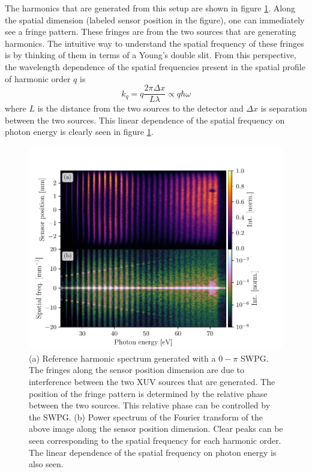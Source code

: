 The harmonics that are generated from this setup are shown in figure \ref{fig:ref_img_pow_spec}. Along the spatial dimension (labeled sensor position in the figure), one can immediately see a fringe pattern.  These fringes are from the two sources that are generating harmonics.  The intuitive way to understand the spatial frequency of these fringes is by thinking of them in terms of a Young's double slit.  From this perspective, the wavelength dependence of the spatial frequencies present in the spatial profile of harmonic order $q$ is
\begin{equation}
	k_q=q\frac{2\pi \Delta x}{L \lambda}\propto q\hbar\omega
\end{equation} 
where $L$ is the distance from the two sources to the detector and $\Delta x$ is separation between the two sources.  This linear dependence of the spatial frequency on photon energy is clearly seen in figure \ref{fig:ref_img_pow_spec}.
\begin{figure}
	\centering
	\includegraphics[width=1.0\textwidth]{figures/Two_source/ref_img_pow_spec.pdf}
	\caption[Harmonic spectrum generated by two sources and its corresponding Fourier transform along the spatial dimension]{(a) Reference harmonic spectrum generated with a $0-\pi$ SWPG. The fringes along the sensor position dimension are due to interference between the two XUV sources that are generated.  The position of the fringe pattern is determined by the relative phase between the two sources.  This relative phase can be controlled by the SWPG. (b) Power spectrum of the Fourier transform of the above image along the sensor position dimension. Clear peaks can be seen corresponding to the spatial frequency for each harmonic order.  The linear dependence of the spatial frequency on photon energy is also seen.}
	\label{fig:ref_img_pow_spec}
\end{figure}

